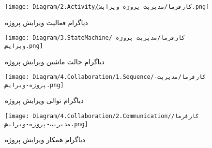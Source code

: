 \begin{figure}[H]
	\centering
	\texttt{[image: Diagram/2.Activity/کارفرما/مدیریت-پروژه-ویرایش.png]}
	\caption{دیاگرام فعالیت ویرایش پروژه}
	\label{fig:a:ویرایش-پروژه}
\end{figure}
\begin{figure}[H]
\centering
\texttt{[image: Diagram/3.StateMachine/کارفرما/مدیریت-پروژه-ویرایش.png]}
\caption{دیاگرام حالت ماشین ویرایش پروژه}
\label{fig:sm:ویرایش-پروژه}
\end{figure}
\begin{figure}[H]
	\centering
	\texttt{[image: Diagram/4.Collaboration/1.Sequence/کارفرما/مدیریت-پروژه-ویرایش.png]}
	\caption{دیاگرام توالی ویرایش پروژه}
	\label{fig:s:ویرایش-پروژه}
\end{figure}
\begin{figure}[H]
\centering
\texttt{[image: Diagram/4.Collaboration/2.Communication/کارفرما/مدیریت-پروژه-ویرایش.png]}
\caption{دیاگرام همکار ویرایش پروژه}
\label{fig:c:ویرایش-پروژه}
\end{figure}
